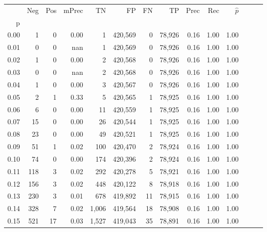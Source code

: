 \begin{tabular}{rrrrrrrrrrrrrr}
\toprule
{} &     Neg &    Pos & mPrec &       TN &       FP &      FN &      TP &  Prec &   Rec & $\hat{p}$ \\
p    &         &        &       &          &          &         &         &       &       &           \\
\midrule
0.00 &       1 &      0 &  0.00 &        1 &  420,569 &       0 &  78,926 &  0.16 &  1.00 &      1.00 \\
0.01 &       0 &      0 &   nan &        1 &  420,569 &       0 &  78,926 &  0.16 &  1.00 &      1.00 \\
0.02 &       1 &      0 &  0.00 &        2 &  420,568 &       0 &  78,926 &  0.16 &  1.00 &      1.00 \\
0.03 &       0 &      0 &   nan &        2 &  420,568 &       0 &  78,926 &  0.16 &  1.00 &      1.00 \\
0.04 &       1 &      0 &  0.00 &        3 &  420,567 &       0 &  78,926 &  0.16 &  1.00 &      1.00 \\
0.05 &       2 &      1 &  0.33 &        5 &  420,565 &       1 &  78,925 &  0.16 &  1.00 &      1.00 \\
0.06 &       6 &      0 &  0.00 &       11 &  420,559 &       1 &  78,925 &  0.16 &  1.00 &      1.00 \\
0.07 &      15 &      0 &  0.00 &       26 &  420,544 &       1 &  78,925 &  0.16 &  1.00 &      1.00 \\
0.08 &      23 &      0 &  0.00 &       49 &  420,521 &       1 &  78,925 &  0.16 &  1.00 &      1.00 \\
0.09 &      51 &      1 &  0.02 &      100 &  420,470 &       2 &  78,924 &  0.16 &  1.00 &      1.00 \\
0.10 &      74 &      0 &  0.00 &      174 &  420,396 &       2 &  78,924 &  0.16 &  1.00 &      1.00 \\
0.11 &     118 &      3 &  0.02 &      292 &  420,278 &       5 &  78,921 &  0.16 &  1.00 &      1.00 \\
0.12 &     156 &      3 &  0.02 &      448 &  420,122 &       8 &  78,918 &  0.16 &  1.00 &      1.00 \\
0.13 &     230 &      3 &  0.01 &      678 &  419,892 &      11 &  78,915 &  0.16 &  1.00 &      1.00 \\
0.14 &     328 &      7 &  0.02 &    1,006 &  419,564 &      18 &  78,908 &  0.16 &  1.00 &      1.00 \\
0.15 &     521 &     17 &  0.03 &    1,527 &  419,043 &      35 &  78,891 &  0.16 &  1.00 &      1.00 \\

\end{tabular}
